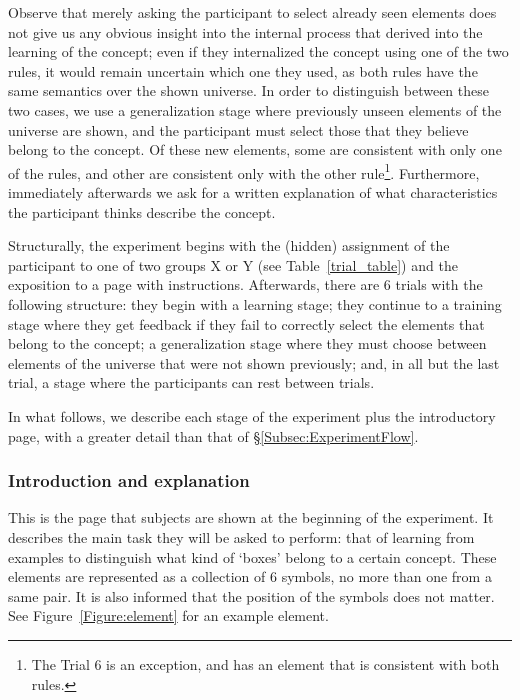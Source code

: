 Observe that merely asking the participant to select already seen elements does not give us any obvious insight into the internal process that derived into the learning of the concept; even if they internalized the concept using one of the two rules, it would remain uncertain which one they used, as both rules have the same semantics over the shown universe. %
In order to distinguish between these two cases, we use a generalization stage where previously unseen elements of the universe are shown, and the participant must select those that they believe belong to the concept. Of these new elements, some are consistent with only one of the rules, and other are consistent only with the other rule\footnote{The Trial 6 is an exception, and has an element that is consistent with both rules.}. Furthermore, immediately afterwards we ask for a written explanation of what characteristics the participant thinks describe the  concept.

Structurally, the experiment begins with the (hidden) assignment of the participant to one of two groups X or Y (see Table~\ref{trial_table}) and the exposition to a page with instructions. 
Afterwards, there are 6 trials with the following structure: they begin with a learning stage; they continue to a training stage where they get feedback if they fail to correctly select the elements that belong to the concept; a generalization stage where they must choose between elements of the universe that were not shown previously; and, in all but the last trial, a stage where the participants can rest between trials.


In what follows, we describe each stage of the experiment plus the introductory page, with a greater detail than that of \S\ref{Subsec:ExperimentFlow}.

\subsubsection{Introduction and explanation}
This is the page that subjects are shown at the beginning of the experiment. It describes the main task they will be asked to perform: that of learning from examples to distinguish what kind of `boxes' belong to a certain concept. These elements are represented as a collection of 6 symbols, no more than one from a same pair. It is also informed that the position of the symbols does not matter. See Figure~\ref{Figure:element} for an example element.

